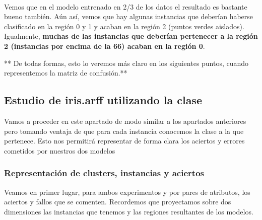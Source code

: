 \documentclass[11pt]{article}
\begin{document}
    \begin{center}
    \end{center}
    { \hspace*{\fill} \\}
    
    Vemos que en el modelo entrenado en 2/3 de los datos el resultado es
bastante bueno también. Aún así, vemos que hay algunas instancias que
deberían haberse clasificado en la región 0 y 1 y acaban en la región 2
(puntos verdes aislados). Igualmente, \textbf{muchas de las instancias
que deberían pertenecer a la región 2 (instancias por encima de la 66)
acaban en la región 0}.

** De todas formas, esto lo veremos más claro en los siguientes puntos,
cuando representemos la matriz de confusión.**

\subsection{Estudio de iris.arff utilizando la
clase}\label{estudio-de-iris.arff-utilizando-la-clase}

Vamos a proceder en este apartado de modo similar a los apartados
anteriores pero tomando ventaja de que para cada instancia conocemos la
clase a la que pertenece. Esto nos permitirá representar de forma clara
los aciertos y errores cometidos por nuestros dos modelos

\subsubsection{Representación de clusters, instancias y
aciertos}\label{representaciuxf3n-de-clusters-instancias-y-aciertos}

Veamos en primer lugar, para ambos experimentos y por pares de
atributos, los aciertos y fallos que se comenten. Recordemos que
proyectamos sobre dos dimensiones las instancias que tenemos y las
regiones resultantes de los modelos.
\end{document}
